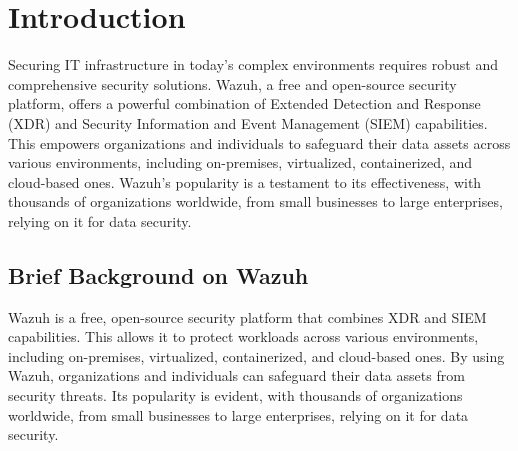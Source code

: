 \section{Introduction}
Securing IT infrastructure in today's complex environments requires robust and comprehensive security solutions. Wazuh, a free and open-source security platform, offers a powerful combination of Extended Detection and Response (XDR) and Security Information and Event Management (SIEM) capabilities. This empowers organizations and individuals to safeguard their data assets across various environments, including on-premises, virtualized, containerized, and cloud-based ones. Wazuh's popularity is a testament to its effectiveness, with thousands of organizations worldwide, from small businesses to large enterprises, relying on it for data security.

\subsection{Brief Background on Wazuh}
Wazuh is a free, open-source security platform that combines XDR and SIEM capabilities. This allows it to protect workloads across various environments, including on-premises, virtualized, containerized, and cloud-based ones. By using Wazuh, organizations and individuals can safeguard their data assets from security threats. Its popularity is evident, with thousands of organizations worldwide, from small businesses to large enterprises, relying on it for data security.